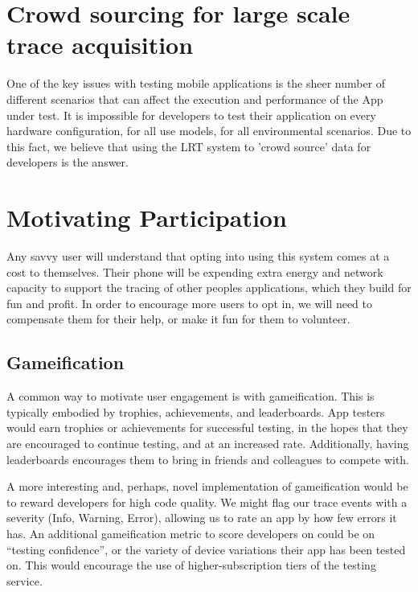 
\section{Crowd sourcing for large scale trace acquisition}
One of the key issues with testing mobile applications is the sheer number
of different scenarios that can affect the execution and performance
of the App under test. It is impossible for developers to test their application
on every hardware configuration, for all use models, for all environmental scenarios.
Due to this fact, we believe that using the LRT system to 'crowd source' data for developers
is the answer.

\section{Motivating Participation}
\label{section:motivatingparticipation}
Any savvy user will understand that opting into using this system comes at a cost to themselves.
Their phone will be expending extra energy and network capacity to support the tracing of 
other peoples applications, which they build for fun and profit.
In order to encourage more users to opt in, we will need to compensate them for their
help, or make it fun for them to volunteer.

\subsection{Gameification}
A common way to motivate user engagement is with gameification. This is typically embodied
by trophies, achievements, and leaderboards. App testers would earn trophies or achievements
for successful testing, in the hopes that they are encouraged to continue testing, and at an
increased rate. Additionally, having leaderboards encourages them to bring in friends and colleagues
to compete with.

A more interesting and, perhaps, novel implementation of gameification would be to reward developers
for high code quality. We might flag our trace events with a severity (Info, Warning, Error), allowing
us to rate an app by how few errors it has. An additional gameification metric to score developers on
could be on ``testing confidence'', or the variety of device variations their app has been tested on.
This would encourage the use of higher-subscription tiers of the testing service.

